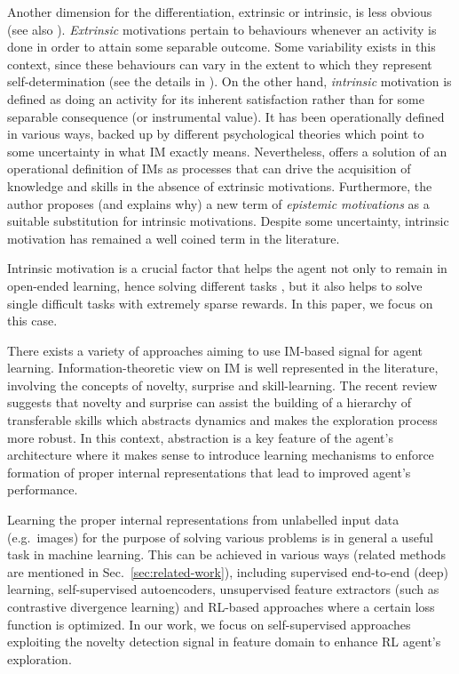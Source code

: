 \documentclass[a4paper,11pt]{elsarticle}
\begin{document}
Another dimension for the differentiation, extrinsic or intrinsic, is less obvious (see also \citep{Morris2022}).
\textit{Extrinsic} motivations pertain to behaviours whenever an activity is done in order to attain some separable outcome. Some variability exists in this context, since these behaviours can vary in the extent to which they represent self-determination (see the details in \citep{Ryan00}).
On the other hand, \textit{intrinsic} motivation is defined as doing an activity for its inherent satisfaction rather than for some separable consequence (or instrumental value). It has been operationally defined in various ways, backed up by different psychological theories which point to some uncertainty in what IM exactly means. Nevertheless,
\cite{Baldassarre19} offers a solution of an operational definition of IMs as processes that can drive the acquisition of knowledge and skills in the absence of extrinsic motivations. Furthermore, the author proposes (and explains why) a new term of \textit{epistemic motivations} as a suitable substitution for intrinsic motivations. 
Despite some uncertainty, intrinsic motivation has remained a well coined term in the literature.

Intrinsic motivation is a crucial factor that helps the agent not only to remain in open-ended learning, hence solving different tasks \citep{Parisi2019}, but it also helps
to solve single difficult tasks with extremely sparse rewards. In this paper, we focus on this case.

There exists a variety of approaches aiming to use IM-based signal for agent learning. Information-theoretic view on IM is well represented in the literature,  involving the concepts of novelty, surprise and skill-learning. The recent review \citep{Aubret2023} suggests that novelty and surprise can assist the building of a hierarchy of transferable skills which abstracts dynamics and makes the exploration process more robust. In this context, abstraction is a key feature of the agent's architecture where it makes sense to introduce learning mechanisms to enforce formation of proper internal representations that lead to improved agent's performance. 

Learning the proper internal representations from unlabelled input data (e.g.~images) for the purpose of solving various problems is in general a useful task in machine learning. This can be achieved in various ways (related methods are mentioned in Sec.~\ref{sec:related-work}), including supervised end-to-end (deep) learning, self-supervised autoencoders, unsupervised feature extractors (such as contrastive divergence learning) and RL-based approaches where a certain loss function is optimized.
In our work, we focus on self-supervised approaches exploiting the novelty detection signal in feature domain to enhance RL agent's exploration.
\end{document}
